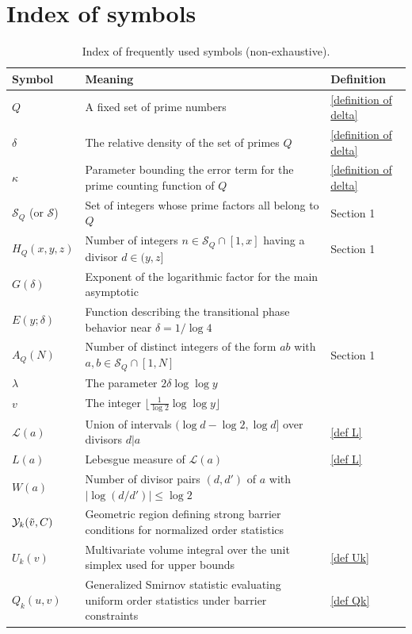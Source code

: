\documentclass{amsart}
\theoremstyle{definition}
\numberwithin{equation}{section}
\renewcommand{\S}{\mathcal{S}}
\newcommand{\density}{\delta}
\begin{document}
		\section*{Index of symbols}
		\begin{table}[h]
			\centering
			\renewcommand{\arraystretch}{1.3}
			\begin{tabular}{lp{6.5cm}l}
				\hline
				\textbf{Symbol} & \textbf{Meaning} & \textbf{Definition} \\
				\hline
				$Q$ & A fixed set of prime numbers & \eqref{definition of delta} \\
				$\density$ & The relative density of the set of primes $Q$ & \eqref{definition of delta} \\
				$\kappa$ & Parameter bounding the error term for the prime counting function of $Q$ & \eqref{definition of delta} \\
				$\S_Q$ (or $\S$) & Set of integers whose prime factors all belong to $Q$ & Section 1 \\
				$H_Q(x,y,z)$ & Number of integers $n \in \S_Q \cap [1,x]$ having a divisor $d \in (y,z]$ & Section 1 \\
				$G(\density)$ & Exponent of the logarithmic factor for the main asymptotic & \Cref{mainthm} \\
				$E(y;\density)$ & Function describing the transitional phase behavior near $\density = 1/\log 4$ & \Cref{mainthm} \\
				$A_Q(N)$ & Number of distinct integers of the form $ab$ with $a,b \in \S_Q \cap [1,N]$ & Section 1 \\
				$\lambda$ & The parameter $2\density \log \log y$ & \Cref{prop 1.4} \\
				$v$ & The integer $\lfloor\frac{1}{\log 2}\log \log y\rfloor$ & \Cref{prop 1.4} \\
				$\mathscr{L}(a)$ & Union of intervals $(\log d - \log 2, \log d]$ over divisors $d|a$ & \eqref{def L} \\
				$L(a)$ & Lebesgue measure of $\mathscr{L}(a)$ & \eqref{def L} \\
				$W(a)$ & Number of divisor pairs $(d,d')$ of $a$ with $|\log(d/d')| \leq \log 2$ & \Cref{cauchy schwarz L} \\
				$\mathcal{Y}_k(\Tilde{v},C)$ & Geometric region defining strong barrier conditions for normalized order statistics & \Cref{lem from L to Yk} \\
				$U_k(v)$ & Multivariate volume integral over the unit simplex used for upper bounds & \eqref{def Uk} \\
				$Q_k(u,v)$ & Generalized Smirnov statistic evaluating uniform order statistics under barrier constraints & \eqref{def Qk} \\
				\hline
			\end{tabular}
			\vspace{0.2cm}
			\caption{ Index of frequently used symbols (non-exhaustive).}
			\label{table:notation}
		\end{table}
\end{document}

